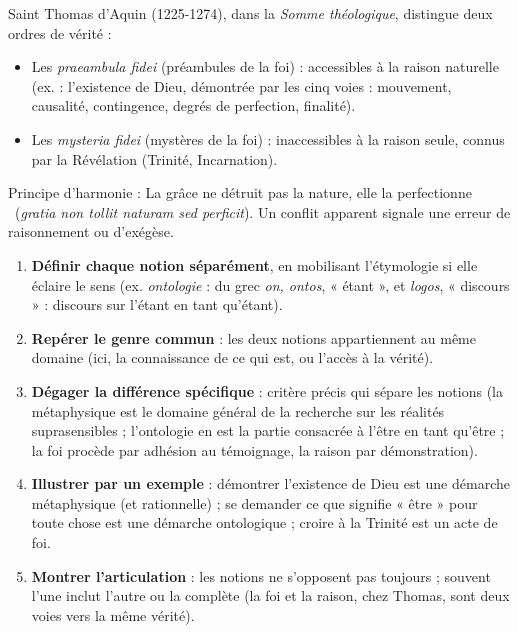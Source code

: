 \documentclass[11pt]{article}
\newcommand{\cle}[1]{{\popxbold\color{popdark}#1}}
\begin{document}
\begin{propriete}
Saint Thomas d'Aquin (1225-1274), dans la \emph{Somme théologique}, distingue deux ordres de vérité :
\begin{itemize}
\item Les \emph{praeambula fidei} (préambules de la foi) : accessibles à la raison naturelle (ex. : l'existence de Dieu, démontrée par les \cle{cinq voies} : mouvement, causalité, contingence, degrés de perfection, finalité).
\item Les \emph{mysteria fidei} (mystères de la foi) : inaccessibles à la raison seule, connus par la Révélation (Trinité, Incarnation).
\end{itemize}
Principe d'harmonie : \guillemotleft La grâce ne détruit pas la nature, elle la perfectionne \guillemotright\ (\emph{gratia non tollit naturam sed perficit}). Un conflit apparent signale une erreur de raisonnement ou d'exégèse.
\end{propriete}

\begin{methode}
\begin{enumerate}
\item \textbf{Définir chaque notion séparément}, en mobilisant l'étymologie si elle éclaire le sens (ex. \emph{ontologie} : du grec \emph{on, ontos}, « étant », et \emph{logos}, « discours » : discours sur l'étant en tant qu'étant).
\item \textbf{Repérer le genre commun} : les deux notions appartiennent au même domaine (ici, la connaissance de ce qui est, ou l'accès à la vérité).
\item \textbf{Dégager la différence spécifique} : critère précis qui sépare les notions (la métaphysique est le domaine général de la recherche sur les réalités suprasensibles ; l'ontologie en est la partie consacrée à l'être en tant qu'être ; la foi procède par adhésion au témoignage, la raison par démonstration).
\item \textbf{Illustrer par un exemple} : démontrer l'existence de Dieu est une démarche métaphysique (et rationnelle) ; se demander ce que signifie « être » pour toute chose est une démarche ontologique ; croire à la Trinité est un acte de foi.
\item \textbf{Montrer l'articulation} : les notions ne s'opposent pas toujours ; souvent l'une inclut l'autre ou la complète (la foi et la raison, chez Thomas, sont deux voies vers la même vérité).
\end{enumerate}
\end{methode}
\end{document}
